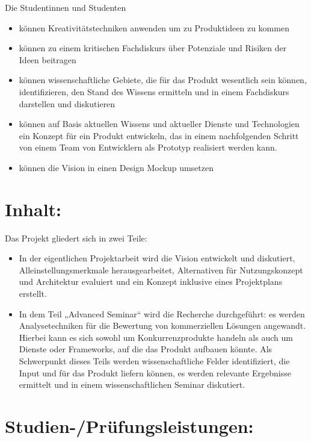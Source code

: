 Die Studentinnen und Studenten

\begin{itemize}
\item
  können Kreativitätstechniken anwenden um zu Produktideen zu kommen
\item
  können zu einem kritischen Fachdiskurs über Potenziale und Risiken der
  Ideen beitragen
\item
  können wissenschaftliche Gebiete, die für das Produkt wesentlich sein
  können, identifizieren, den Stand des Wissens ermitteln und in einem
  Fachdiskurs darstellen und diskutieren
\item
  können auf Basis aktuellen Wissens und aktueller Dienste und
  Technologien ein Konzept für ein Produkt entwickeln, das in einem
  nachfolgenden Schritt von einem Team von Entwicklern als Prototyp
  realisiert werden kann.
\item
  können die Vision in einen Design Mockup umsetzen
\end{itemize}

\section*{Inhalt:}\label{inhalt-16}

Das Projekt gliedert sich in zwei Teile:

\begin{itemize}
\item
  In der eigentlichen Projektarbeit wird die Vision entwickelt und
  diskutiert, Alleinstellungsmerkmale herausgearbeitet, Alternativen für
  Nutzungskonzept und Architektur evaluiert und ein Konzept inklusive
  eines Projektplans erstellt.
\item
  In dem Teil „Advanced Seminar`` wird die Recherche durchgeführt: es
  werden Analysetechniken für die Bewertung von kommerziellen Lösungen
  angewandt. Hierbei kann es sich sowohl um Konkurrenzprodukte handeln
  als auch um Dienste oder Frameworks, auf die das Produkt aufbauen
  könnte. Als Schwerpunkt dieses Teils werden wissenschaftliche Felder
  identifiziert, die Input und für das Produkt liefern können, es werden
  relevante Ergebnisse ermittelt und in einem wissenschaftlichen Seminar
  diskutiert.
\end{itemize}

\section*{Studien-/Prüfungsleistungen:}\label{studien-pruxfcfungsleistungen-16}

